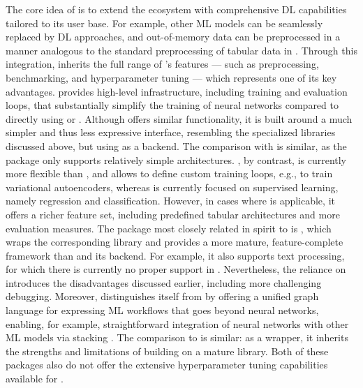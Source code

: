 \documentclass[article]{jss}
\theoremstyle{definition}
\begin{document}
The core idea of \mlrttorch{} is to extend the \mlrt{} ecosystem with comprehensive DL capabilities tailored to its user base.
For example, other ML models can be seamlessly replaced by DL approaches, and out-of-memory data can be preprocessed in a manner analogous to the standard preprocessing of tabular data in \mlrt{}.
Through this integration, \mlrttorch{} inherits the full range of \mlrt{}’s features — such as preprocessing, benchmarking, and hyperparameter tuning \citep{ref-mlr3tuning2024} — which represents one of its key advantages.
\mlrttorch{} provides high-level infrastructure, including training and evaluation loops, that substantially simplify the training of neural networks compared to directly using  or .
Although  offers similar functionality, it is built around a much simpler and thus less expressive interface, resembling the specialized libraries discussed above, but using  as a backend.
The comparison with  is similar, as the package only supports relatively simple architectures.
, by contrast, is currently more flexible than \mlrttorch{}, and allows to define custom training loops, e.g., to train variational autoencoders, whereas \mlrttorch{} is currently focused on supervised learning, namely regression and classification.
However, in cases where \mlrttorch{} is applicable, it offers a richer feature set, including predefined tabular architectures and more evaluation measures.
The package most closely related in spirit to \mlrttorch{} is , which wraps the corresponding \python{} library and provides a more mature, feature-complete framework than \mlrttorch{} and its \torch{} backend.
For example, it also supports text processing, for which there is currently no proper support in \mlrttorch{}.
Nevertheless, the reliance on \python{} introduces the disadvantages discussed earlier, including more challenging debugging.
Moreover, \mlrttorch{} distinguishes itself from  by offering a unified graph language for expressing ML workflows that goes beyond neural networks, enabling, for example, straightforward integration of neural networks with other ML models via stacking \citep{ref-mlr3book-chap8}.
The comparison to  is similar: as a \python{} wrapper, it inherits the strengths and limitations of building on a mature \python{} library.
Both of these packages also do not offer the extensive hyperparameter tuning capabilities available for \mlrttorch{}.
\end{document}
